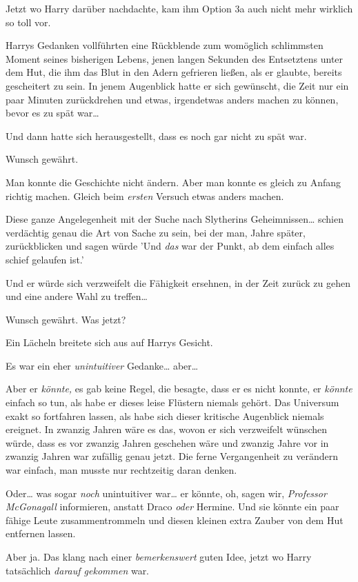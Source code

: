 {Jetzt wo Harry darüber nachdachte, kam ihm Option 3a auch nicht mehr wirklich so toll vor.

Harrys Gedanken vollführten eine Rückblende zum womöglich schlimmsten Moment seines bisherigen Lebens, jenen langen Sekunden des Entsetztens unter dem Hut, die ihm das Blut in den Adern gefrieren ließen, als er glaubte, bereits gescheitert zu sein. In jenem Augenblick hatte er sich gewünscht, die Zeit nur ein paar Minuten zurückdrehen und etwas, irgendetwas anders machen zu können, bevor es zu spät war…

Und dann hatte sich herausgestellt, dass es noch gar nicht zu spät war.

Wunsch gewährt.

Man konnte die Geschichte nicht ändern. Aber man konnte es gleich zu Anfang richtig machen. Gleich beim \emph{ersten} Versuch etwas anders machen.

Diese ganze Angelegenheit mit der Suche nach Slytherins Geheimnissen… schien verdächtig genau die Art von Sache zu sein, bei der man, Jahre später, zurückblicken und sagen würde 'Und \emph{das} war der Punkt, ab dem einfach alles schief gelaufen ist.'

Und er würde sich verzweifelt die Fähigkeit ersehnen, in der Zeit zurück zu gehen und eine andere Wahl zu treffen…

Wunsch gewährt. Was jetzt?

Ein Lächeln breitete sich aus auf Harrys Gesicht.

Es war ein eher \emph{unintuitiver} Gedanke… aber…

Aber er \emph{könnte,} es gab keine Regel, die besagte, dass er es nicht konnte, er \emph{könnte} einfach so tun, als habe er dieses leise Flüstern niemals gehört. Das Universum exakt so fortfahren lassen, als habe sich dieser kritische Augenblick niemals ereignet. In zwanzig Jahren wäre es das, wovon er sich verzweifelt wünschen würde, dass es vor zwanzig Jahren geschehen wäre und zwanzig Jahre vor in zwanzig Jahren war zufällig genau jetzt. Die ferne Vergangenheit zu verändern war einfach, man musste nur rechtzeitig daran denken.

Oder… was sogar \emph{noch} unintuitiver war… er könnte, oh, sagen wir, \emph{Professor McGonagall} informieren, anstatt Draco \emph{oder} Hermine. Und sie könnte ein paar fähige Leute zusammentrommeln und diesen kleinen extra Zauber von dem Hut entfernen lassen.

Aber ja. Das klang nach einer \emph{bemerkenswert} guten Idee, jetzt wo Harry tatsächlich \emph{darauf gekommen} war.

}
